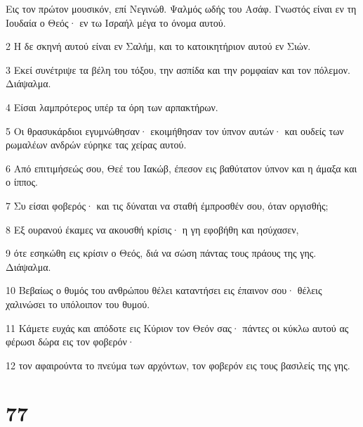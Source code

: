 \par Εις τον πρώτον μουσικόν, επί Νεγινώθ. Ψαλμός ωδής του Ασάφ. Γνωστός είναι εν τη Ιουδαία ο Θεός· εν τω Ισραήλ μέγα το όνομα αυτού.
\par 2 Η δε σκηνή αυτού είναι εν Σαλήμ, και το κατοικητήριον αυτού εν Σιών.
\par 3 Εκεί συνέτριψε τα βέλη του τόξου, την ασπίδα και την ρομφαίαν και τον πόλεμον. Διάψαλμα.
\par 4 Είσαι λαμπρότερος υπέρ τα όρη των αρπακτήρων.
\par 5 Οι θρασυκάρδιοι εγυμνώθησαν· εκοιμήθησαν τον ύπνον αυτών· και ουδείς των ρωμαλέων ανδρών εύρηκε τας χείρας αυτού.
\par 6 Από επιτιμήσεώς σου, Θεέ του Ιακώβ, έπεσον εις βαθύτατον ύπνον και η άμαξα και ο ίππος.
\par 7 Συ είσαι φοβερός· και τις δύναται να σταθή έμπροσθέν σου, όταν οργισθής;
\par 8 Εξ ουρανού έκαμες να ακουσθή κρίσις· η γη εφοβήθη και ησύχασεν,
\par 9 ότε εσηκώθη εις κρίσιν ο Θεός, διά να σώση πάντας τους πράους της γης. Διάψαλμα.
\par 10 Βεβαίως ο θυμός του ανθρώπου θέλει καταντήσει εις έπαινον σου· θέλεις χαλινώσει το υπόλοιπον του θυμού.
\par 11 Κάμετε ευχάς και απόδοτε εις Κύριον τον Θεόν σας· πάντες οι κύκλω αυτού ας φέρωσι δώρα εις τον φοβερόν·
\par 12 τον αφαιρούντα το πνεύμα των αρχόντων, τον φοβερόν εις τους βασιλείς της γης.

\chapter{77}

